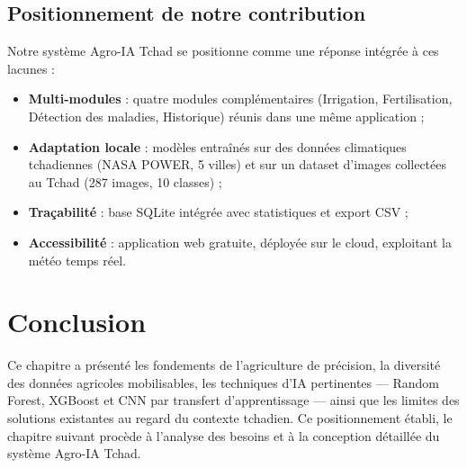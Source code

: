 \subsection{Positionnement de notre contribution}

Notre système Agro-IA Tchad se positionne comme une réponse
intégrée à ces lacunes :

\begin{itemize}[leftmargin=1.2cm]
	\item \textbf{Multi-modules} : quatre modules complémentaires
	(Irrigation, Fertilisation, Détection des maladies,
	Historique) réunis dans une même application ;
	\item \textbf{Adaptation locale} : modèles entraînés sur des
	données climatiques tchadiennes (NASA POWER, 5 villes)
	et sur un dataset d'images collectées au Tchad
	(287 images, 10 classes) ;
	\item \textbf{Traçabilité} : base SQLite intégrée avec
	statistiques et export CSV ;
	\item \textbf{Accessibilité} : application web gratuite,
	déployée sur le cloud, exploitant la météo temps réel.
\end{itemize}
\section*{Conclusion}

Ce chapitre a présenté les fondements de l'agriculture de
précision, la diversité des données agricoles mobilisables, les
techniques d'IA pertinentes --- Random Forest, XGBoost et CNN
par transfert d'apprentissage --- ainsi que les limites des
solutions existantes au regard du contexte tchadien. Ce
positionnement établi, le chapitre suivant procède à l'analyse
des besoins et à la conception détaillée du système Agro-IA
Tchad.